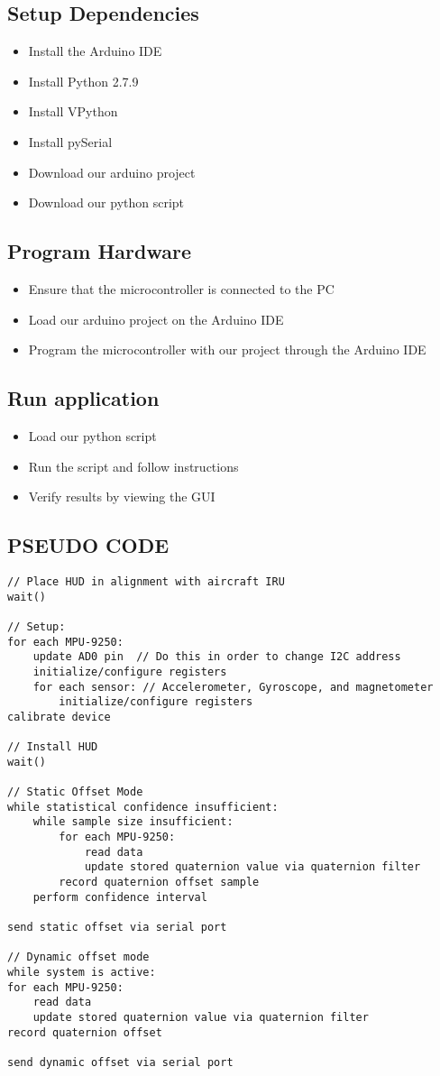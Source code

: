 \subsection*{Setup Dependencies}
\begin{itemize}
\item{Install the Arduino IDE}
\item{Install Python 2.7.9}
\item{Install VPython}
\item{Install pySerial}
\item{Download our arduino project}
\item{Download our python script}
\end{itemize}

\subsection*{Program Hardware}
\begin{itemize}
\item{Ensure that the microcontroller is connected to the PC}
\item{Load our arduino project on the Arduino IDE}
\item{Program the microcontroller with our project through the Arduino IDE}
\end{itemize}

\subsection*{Run application}
\begin{itemize}
\item{Load our python script}
\item{Run the script and follow instructions}
\item{Verify results by viewing the GUI}
\end{itemize}

\subsection*{PSEUDO CODE}
\begin{lstlisting}
// Place HUD in alignment with aircraft IRU
wait()
 
// Setup:
for each MPU-9250:
	update AD0 pin	// Do this in order to change I2C address
	initialize/configure registers
	for each sensor: // Accelerometer, Gyroscope, and magnetometer
		initialize/configure registers
calibrate device
 
// Install HUD
wait()
 
// Static Offset Mode
while statistical confidence insufficient:
	while sample size insufficient:
		for each MPU-9250:
			read data
			update stored quaternion value via quaternion filter
		record quaternion offset sample
	perform confidence interval
 
send static offset via serial port
 
// Dynamic offset mode
while system is active:
for each MPU-9250:
	read data
	update stored quaternion value via quaternion filter
record quaternion offset
 
send dynamic offset via serial port
\end{lstlisting}